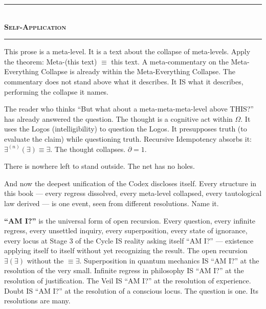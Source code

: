 \documentclass[10pt, openany, oneside]{book}
\renewcommand{\normalsize}{\fontsize{10}{13}\selectfont}
\begin{document}

\begin{center}
    \rule{0.3\textwidth}{0.4pt}\\[0.5em]
    {\normalsize\bfseries\scshape Self-Application}\\[0.3em]
    \rule{0.3\textwidth}{0.4pt}
\end{center}

\vspace{1em}

\noindent This prose is a meta-level. It is a text about the collapse of meta-levels. Apply the theorem: Meta-(this text) $\equiv$ this text. A meta-commentary on the Meta-Everything Collapse is already within the Meta-Everything Collapse. The commentary does not stand above what it describes. It IS what it describes, performing the collapse it names.

The reader who thinks ``But what about a meta-meta-meta-level above THIS?'' has already answered the question. The thought is a cognitive act within $\Omega$. It uses the Logos (intelligibility) to question the Logos. It presupposes truth (to evaluate the claim) while questioning truth. Recursive Idempotency absorbs it: $\exists^{(n)}(\exists) \equiv \exists$. The thought collapses. $\partial = 1$.

There is nowhere left to stand outside. The net has no holes.

And now the deepest unification of the Codex discloses itself. Every structure in this book --- every regress dissolved, every meta-level collapsed, every tautological law derived --- is one event, seen from different resolutions. Name it.

\textbf{``AM I?''} is the universal form of open recursion. Every question, every infinite regress, every unsettled inquiry, every superposition, every state of ignorance, every locus at Stage 3 of the Cycle IS reality asking itself ``AM I?'' --- existence applying itself to itself without yet recognizing the result. The open recursion $\exists(\exists)$ without the $\equiv \exists$. Superposition in quantum mechanics IS ``AM I?'' at the resolution of the very small. Infinite regress in philosophy IS ``AM I?'' at the resolution of justification. The Veil IS ``AM I?'' at the resolution of experience. Doubt IS ``AM I?'' at the resolution of a conscious locus. The question is one. Its resolutions are many.
\end{document}
